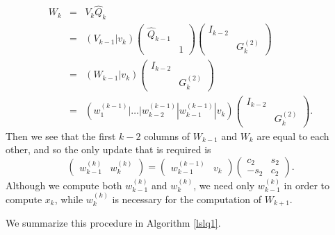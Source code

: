 \documentclass[11pt]{article}
\newcommand{\hQ}{\hat{Q}}
\begin{document}
\begin{eqnarray}
W_k &=& V_k \hQ_k \\
&=& (V_{k-1} | v_k) \begin{pmatrix}
\hQ_{k-1} & \\ & 1
\end{pmatrix} \begin{pmatrix}
I_{k-2} & \\ & G^{(2)}_k
\end{pmatrix} \\
&=& (W_{k-1} | v_k) \begin{pmatrix}
I_{k-2} & \\ & G^{(2)}_k
\end{pmatrix} \\
&=& (w^{(k-1)}_1 | \dots | w^{(k-1)}_{k-2} | w^{(k-1)}_{k-1} | v_k) \begin{pmatrix}
I_{k-2} & \\ & G^{(2)}_k
\end{pmatrix}.
\end{eqnarray}
Then we see that the first $k-2$ columns of $W_{k-1}$ and $W_k$ are equal to each other, and so the only update that is required is
\begin{equation}
\begin{pmatrix} w^{(k)}_{k-1} & w^{(k)}_k \end{pmatrix} = 
\begin{pmatrix} w^{(k-1)}_{k-1} & v_k \end{pmatrix}
\begin{pmatrix}  c_2 & s_2 \\ -s_2 & c_2 \end{pmatrix}.
\end{equation}
Although we compute both $w^{(k)}_{k-1}$ and $w^{(k)}_k$, we need only $w^{(k)}_{k-1}$ in order to compute $x_k$, while $w^{(k)}_k$ is necessary for the computation of $W_{k+1}$.

We summarize this procedure in Algorithm \ref{lslq1}.
\end{document}
